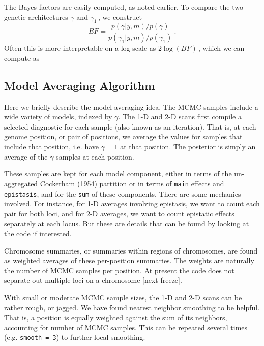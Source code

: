 \documentclass[12pt]{article}
\begin{document}
The Bayes factors are easily computed, as noted earlier. To compare
the two genetic architectures $\gamma$ and $\gamma_1$\,, we construct
$$
BF = \frac{\displaystyle p(\gamma\vert y,m)/p(\gamma)}
{\displaystyle p(\gamma_1\vert y,m)/p(\gamma_1)}~.
$$
Often this is more interpretable on a log scale as $2\log(BF)$\,,
which we can compute as

\subsection{Model Averaging Algorithm}

Here we briefly describe the model averaging idea. The MCMC samples
include a wide variety of models, indexed by $\gamma$. The 1-D and 2-D
scans first compile a selected diagnostic for each sample (also known
as an iteration). That is, at each genome position, or pair of
positions, we average the values for samples that include that
position, i.e. have $\gamma=1$ at that position. The posterior is
simply an average of the $\gamma$ samples at each position.

These samples are kept for each model component, either in terms of
the un-aggregated Cockerham (1954) partition or in terms of {\tt main}
effects and {\tt epistasis}, and for the {\tt sum} of these
components. There are some mechanics involved. For instance, for 
1-D averages involving epistasis, we want to count each pair for both
loci, and for 2-D averages, we want to count epistatic effects
separately at each locus. But these are details that can be found by
looking at the code if interested.

Chromosome summaries, or summaries within regions of chromosomes, are
found as weighted averages of these per-position summaries. The
weights are naturally the number of MCMC samples per position. At
present the code does not separate out multiple loci on a chromosome
[next freeze].

With small or moderate MCMC sample sizes, the 1-D and 2-D scans can be
rather rough, or jagged. We have found nearest neighbor smoothing to
be helpful. That is, a position is equally weighted against the sum of
its neighbors, accounting for number of MCMC samples. This can be
repeated several times (e.g. {\tt smooth = 3}) to further local
smoothing. 
\end{document}
